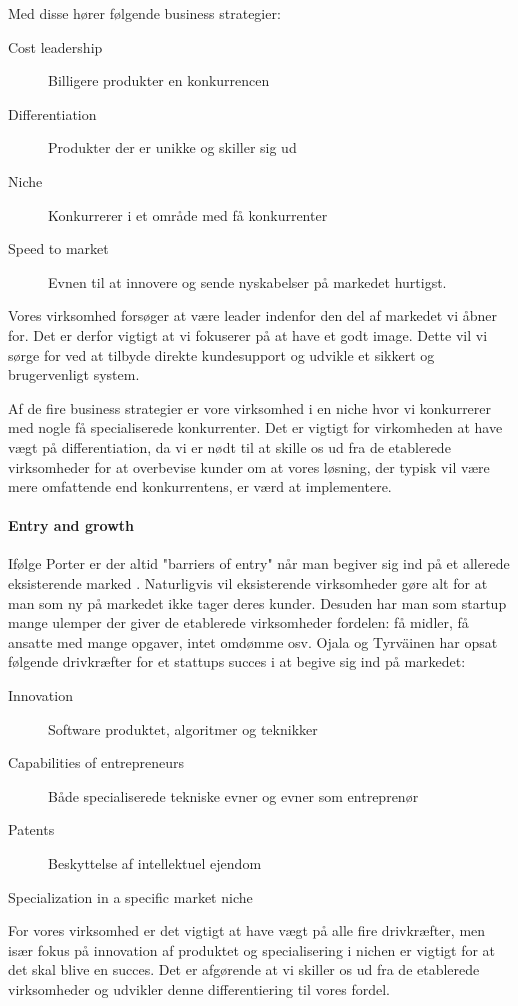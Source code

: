 Med disse hører følgende business strategier:
\begin{description}
	\item[Cost leadership] Billigere produkter en konkurrencen
	\item [Differentiation] Produkter der er unikke og skiller sig ud
	\item [Niche] Konkurrerer i et område med få konkurrenter
	\item [Speed to market] Evnen til at innovere og sende nyskabelser på markedet hurtigst.
\end{description}

Vores virksomhed forsøger at være leader indenfor den del af markedet vi åbner for.
Det er derfor vigtigt at vi fokuserer på at have et godt image.
Dette vil vi sørge for ved at tilbyde direkte kundesupport og udvikle et sikkert og brugervenligt system.

Af de fire business strategier er vore virksomhed i en niche hvor vi konkurrerer med nogle få specialiserede konkurrenter.
Det er vigtigt for virkomheden at have vægt på differentiation, da vi er nødt til at skille os ud fra de etablerede virksomheder for at overbevise kunder om at vores løsning, der typisk vil være mere omfattende end konkurrentens, er værd at implementere.

\paragraph{Entry and growth}
Ifølge Porter er der altid "barriers of entry" når man begiver sig ind på et allerede eksisterende marked \citep[p.~50]{rose2012software}.
Naturligvis vil eksisterende virksomheder gøre alt for at man som ny på markedet ikke tager deres kunder.
Desuden har man som startup mange ulemper der giver de etablerede virksomheder fordelen: få midler, få ansatte med mange opgaver, intet omdømme osv.
Ojala og Tyrväinen har opsat følgende drivkræfter for et stattups succes i at begive sig ind på markedet: \citep[p.~50]{rose2012software}

\begin{description}
	\item[Innovation] Software produktet, algoritmer og teknikker
	\item [Capabilities of entrepreneurs] Både specialiserede tekniske evner og evner som entreprenør
	\item [Patents] Beskyttelse af intellektuel ejendom
	\item [Specialization in a specific market niche] 
\end{description}

For vores virksomhed er det vigtigt at have vægt på alle fire drivkræfter, men især fokus på innovation af produktet og specialisering i nichen er vigtigt for at det skal blive en succes.
Det er afgørende at vi skiller os ud fra de etablerede virksomheder og udvikler denne differentiering til vores fordel.